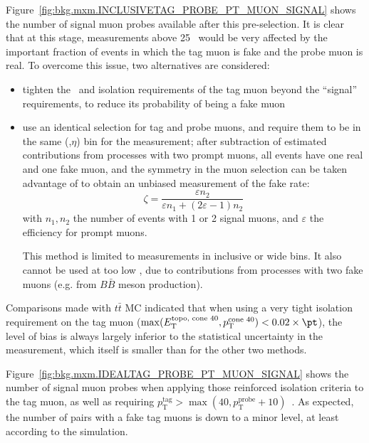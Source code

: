 Figure~\ref{fig:bkg.mxm.INCLUSIVETAG_PROBE_PT_MUON_SIGNAL} shows the number of signal muon probes available after this pre-selection. 
It is clear that at this stage, measurements above 25 \GeV~would be very affected by the important fraction of events 
in which the tag muon is fake and the probe muon is real. 
To overcome this issue, two alternatives are considered: 
\begin{itemize}
\item tighten the \pt\ and isolation requirements of the tag muon beyond the ``signal'' requirements,
to reduce its probability of being a fake muon
\item use an identical selection for tag and probe muons, and require them to be in the same (\pt,$\eta$) bin for the measurement; 
after subtraction of estimated contributions from processes with two prompt muons, all events have one real and one fake muon, 
and the symmetry in the muon selection can be taken advantage of to obtain an unbiased measurement of the fake rate: 
$$
\zeta = \frac{\varepsilon n_2}{\varepsilon n_1+(2\varepsilon-1)n_2}
$$
with $n_1, n_2$ the number of events with 1 or 2 signal muons, 
and $\varepsilon$ the efficiency for prompt muons.

This method is limited to measurements in inclusive or wide bins. 
It also cannot be used at too low \pt, due to contributions from processes with two fake muons (e.g. from $B\bar B$ meson production). 
\end{itemize}
Comparisons made with $t\bar t$ MC indicated that when using a very tight isolation requirement on the tag muon 
($\operatorname{max}(E_\mathrm{T}^\text{topo, cone 40},p_\mathrm{T}^\text{cone 40})<0.02\times\pt$), 
the level of bias is always largely inferior to the statistical uncertainty in the measurement, 
which itself is smaller than for the other two methods. 

Figure~\ref{fig:bkg.mxm.IDEALTAG_PROBE_PT_MUON_SIGNAL} shows the number of signal muon probes when applying those reinforced isolation criteria to the tag muon, 
as well as requiring $p_\mathrm{T}^\text{tag}>\operatorname{max}(40,p_\mathrm{T}^\text{probe}+10)$~\GeV. 
As expected, the number of pairs with a fake tag muons is down to a minor level, at least according to the simulation. 

